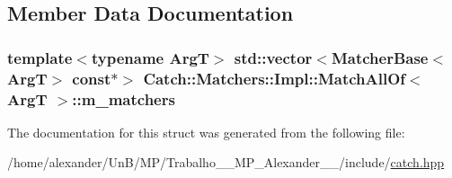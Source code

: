 \subsection{Member Data Documentation}
\hypertarget{structCatch_1_1Matchers_1_1Impl_1_1MatchAllOf_a98d6a2611f195a4a5c49f92fd877be9a}{
\subsubsection[{m\-\_\-matchers}]{\setlength{\rightskip}{0pt plus 5cm}template$<$typename Arg\-T$>$ std\-::vector$<${\bf Matcher\-Base}$<$Arg\-T$>$ const$\ast$$>$ {\bf Catch\-::\-Matchers\-::\-Impl\-::\-Match\-All\-Of}$<$ Arg\-T $>$\-::m\-\_\-matchers}}\label{structCatch_1_1Matchers_1_1Impl_1_1MatchAllOf_a98d6a2611f195a4a5c49f92fd877be9a}


The documentation for this struct was generated from the following file\-:\begin{DoxyCompactItemize}
\item 
/home/alexander/\-Un\-B/\-M\-P/\-Trabalho\-\_\-\_\-\-M\-P\-\_\-\-Alexander\-\_\-\_/include/\hyperlink{catch_8hpp}{catch.\-hpp}\end{DoxyCompactItemize}
